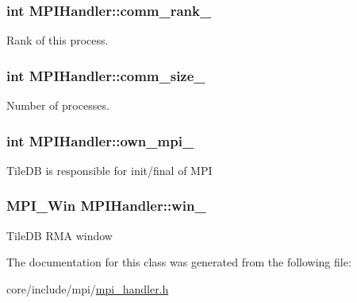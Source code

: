 \subsubsection[{comm\+\_\+rank\+\_\+}]{\setlength{\rightskip}{0pt plus 5cm}int M\+P\+I\+Handler\+::comm\+\_\+rank\+\_\+\hspace{0.3cm}{\ttfamily [private]}}\label{classMPIHandler_ab40d7142395e4e2fcf482970abdc0c18}
Rank of this process. \hypertarget{classMPIHandler_ac9745049b3eac4bb4c20c0c287f18747}{}
\subsubsection[{comm\+\_\+size\+\_\+}]{\setlength{\rightskip}{0pt plus 5cm}int M\+P\+I\+Handler\+::comm\+\_\+size\+\_\+\hspace{0.3cm}{\ttfamily [private]}}\label{classMPIHandler_ac9745049b3eac4bb4c20c0c287f18747}
Number of processes. \hypertarget{classMPIHandler_ac643213587230d8f33563b69c9e2167e}{}
\subsubsection[{own\+\_\+mpi\+\_\+}]{\setlength{\rightskip}{0pt plus 5cm}int M\+P\+I\+Handler\+::own\+\_\+mpi\+\_\+\hspace{0.3cm}{\ttfamily [private]}}\label{classMPIHandler_ac643213587230d8f33563b69c9e2167e}
Tile\+D\+B is responsible for init/final of M\+P\+I \hypertarget{classMPIHandler_abf263cb1fb99e87c363e63e28b70a3eb}{}
\subsubsection[{win\+\_\+}]{\setlength{\rightskip}{0pt plus 5cm}M\+P\+I\+\_\+\+Win M\+P\+I\+Handler\+::win\+\_\+\hspace{0.3cm}{\ttfamily [private]}}\label{classMPIHandler_abf263cb1fb99e87c363e63e28b70a3eb}
Tile\+D\+B R\+M\+A window 

The documentation for this class was generated from the following file\+:\begin{DoxyCompactItemize}
\item 
core/include/mpi/\hyperlink{mpi__handler_8h}{mpi\+\_\+handler.\+h}\end{DoxyCompactItemize}
